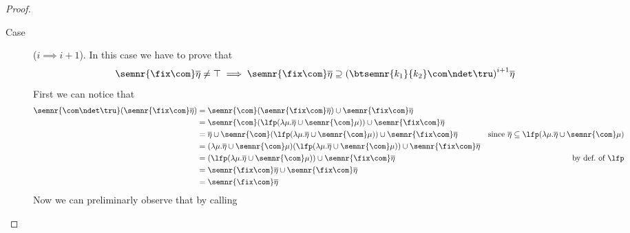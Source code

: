 \begin{proof}
\begin{inductive}
\begin{description}
    \item[Case] (\(i \implies i+1\)). In this case we have to prove
      that
      \begin{equation*}
        \semnr{\fix\com}\overline\eta \neq \top
        \implies
        \semnr{\fix\com}\overline\eta \supseteq {\left(\btsemnr{k_1}{k_2}\com\ndet\tru\right)}^{i+1}\overline\eta
      \end{equation*}
      First we can notice that
      \begin{align*}
        \semnr{\com\ndet\tru}(\semnr{\fix\com}\overline\eta) & = \semnr{\com}(\semnr{\fix\com}\overline\eta) \cup \semnr{\fix\com}\overline\eta \\
                                                    & = \semnr{\com}(\lfp(\lambda \mu . \overline\eta \cup \semnr{\com}\mu)) \cup \semnr{\fix\com}\overline\eta \\
                                                    & = \overline\eta \cup \semnr{\com}(\lfp(\lambda \mu . \overline\eta \cup \semnr{\com}\mu)) \cup \semnr{\fix\com}\overline\eta & \text{since } \overline\eta \subseteq \lfp(\lambda \mu . \overline\eta \cup \semnr{\com}\mu)\\
                                                    & = (\lambda \mu . \overline\eta \cup \semnr{\com}\mu)(\lfp(\lambda \mu . \overline\eta \cup \semnr{\com}\mu)) \cup \semnr{\fix\com}\overline\eta \\
                                                    & = (\lfp(\lambda \mu . \overline\eta \cup \semnr{\com}\mu)) \cup \semnr{\fix\com}\overline\eta & \text{by def.\ of } \lfp\\
                                                    & = \semnr{\fix\com}\overline\eta \cup \semnr{\fix\com}\overline\eta \\
                                                    & = \semnr{\fix\com}\overline\eta
      \end{align*}
      Now we can preliminarly observe that by calling

\end{description}
\end{inductive}
\end{proof}
